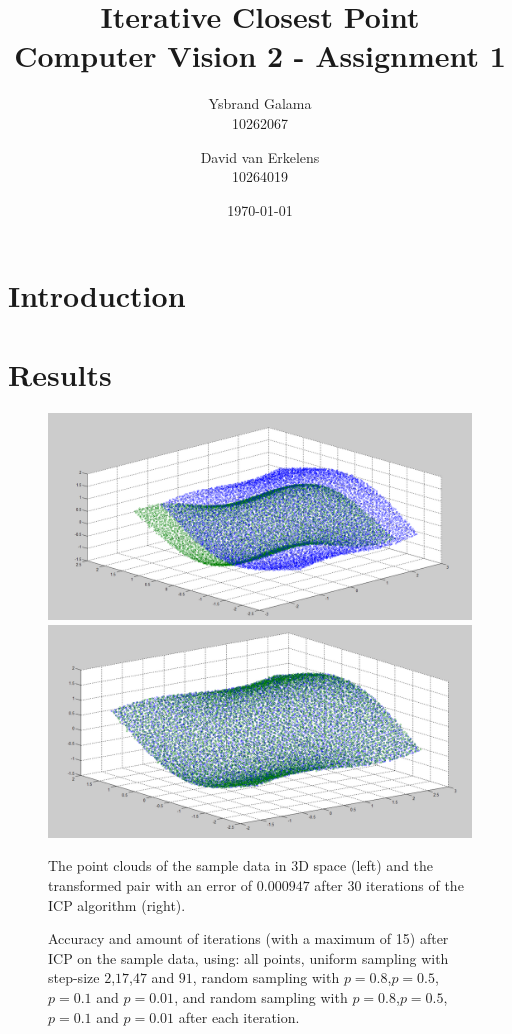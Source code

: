 \documentclass[11pt,a4paper]{article}
\title{Iterative Closest Point \\ {\large Computer Vision 2 - Assignment 1}}
\author{Ysbrand Galama \\ 10262067 \and David van Erkelens \\ 10264019}
\date{\today}
\begin{document}
\maketitle

\section{Introduction}

\section{Results}
\begin{figure}
\centering
\includegraphics[width=.49\textwidth,height=.49\textwidth]{graphs/sam_i.png}
\includegraphics[width=.49\textwidth,height=.49\textwidth]{graphs/sam_o.png}
\caption{The point clouds of the sample data in 3D space (left) and the transformed pair with an error of $0.000947$ after $30$ iterations of the ICP algorithm (right).}
\label{fig:sam0}
\end{figure}

\begin{figure}
\centering

\caption{Accuracy and amount of iterations (with a maximum of 15) after ICP on the sample data, using: all points, uniform sampling with step-size $2$,$17$,$47$ and $91$, random sampling with $p=0.8$,$p=0.5$,$p=0.1$ and $p=0.01$, and random sampling with $p=0.8$,$p=0.5$,$p=0.1$ and $p=0.01$ after each iteration.}
\label{fig:sam1}
\end{figure}
\end{document}
